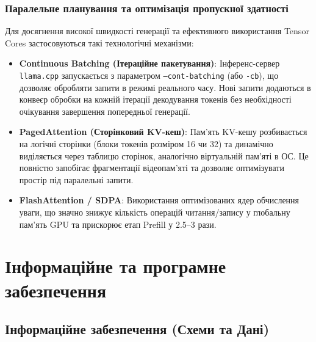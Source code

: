 \documentclass{article}
\begin{document}
\subsubsection{Паралельне планування та оптимізація пропускної здатності}

Для досягнення високої швидкості генерації та ефективного використання Tensor Cores застосовуються такі технологічні механізми:
\begin{itemize}
    \item \textbf{Continuous Batching (Ітераційне пакетування)}: Інференс-сервер \texttt{llama.cpp} запускається з параметром \texttt{--cont-batching} (або \texttt{-cb}), що дозволяє обробляти запити в режимі реального часу. Нові запити додаються в конвеєр обробки на кожній ітерації декодування токенів без необхідності очікування завершення попередньої генерації.
    \item \textbf{PagedAttention (Сторінковий KV-кеш)}: Пам'ять KV-кешу розбивається на логічні сторінки (блоки токенів розміром 16 чи 32) та динамічно виділяється через таблицю сторінок, аналогічно віртуальній пам'яті в ОС. Це повністю запобігає фрагментації відеопам'яті та дозволяє оптимізувати простір під паралельні запити.
    \item \textbf{FlashAttention / SDPA}: Використання оптимізованих ядер обчислення уваги, що значно знижує кількість операцій читання/запису у глобальну пам'ять GPU та прискорює етап Prefill у 2.5--3 рази.
\end{itemize}

\newpage

\section{Інформаційне та програмне забезпечення}

\subsection{Інформаційне забезпечення (Схеми та Дані)}
\end{document}
